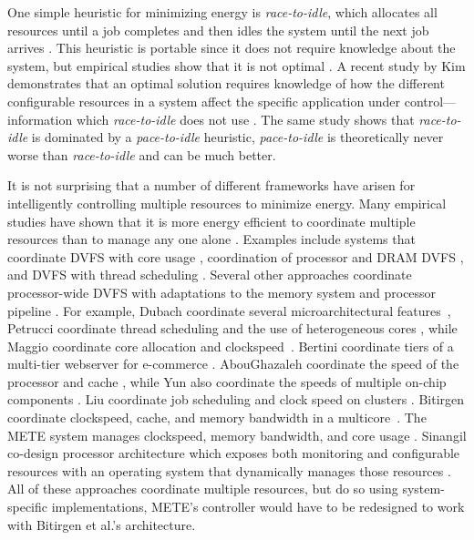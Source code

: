 One simple heuristic for minimizing energy is \emph{race-to-idle}, which allocates all resources until a job completes and then idles the system until the next job arrives \cite{google}.
This heuristic is portable since it does not require knowledge about the system, but empirical studies show that it is not optimal \cite{google,Cheng2009,Yun2010,Yang2007}.
A recent study by Kim \etal demonstrates that an optimal solution requires knowledge of how the different configurable resources in a system affect the specific application under control---information which \emph{race-to-idle} does not use \cite{kim-cpsna2015}.
The same study shows that \emph{race-to-idle} is dominated by a \emph{pace-to-idle} heuristic, \ie \emph{pace-to-idle} is theoretically never worse than \emph{race-to-idle} and can be much better.

It is not surprising that a number of different frameworks have arisen for intelligently controlling multiple resources to minimize energy.
Many empirical studies have shown that it is more energy efficient to coordinate multiple resources than to manage any one alone \cite{google,Cheng2009,Yun2010,Yang2007}.
Examples include systems that coordinate DVFS with core usage \cite{packandcap-old,packandcap-new,TCST}, coordination of processor and DRAM DVFS \cite{CoScale,Chen2011,Felter2005,Li2007}, and DVFS with thread scheduling \cite{Rangan2009,Winter2010}.
Several other approaches coordinate processor-wide DVFS with adaptations to the memory system and processor pipeline \cite{METE,Bitirgen2008,dubach2010}.
For example, Dubach \etal coordinate several microarchitectural features~\cite{dubach2010},
Petrucci \etal coordinate thread scheduling and the use of heterogeneous cores \cite{Petrucci2012}, while Maggio \etal coordinate core allocation and clockspeed~\cite{TCST}.
Bertini \etal coordinate tiers of a multi-tier webserver for e-commerce \cite{Bertini2007}.
AbouGhazaleh \etal coordinate the speed of the processor and cache \cite{AbouGhazaleh2007}, while Yun \etal also coordinate the speeds of multiple on-chip components \cite{Yun2010}.
Liu \etal coordinate job scheduling and clock speed on clusters \cite{Liu2008}.
Bitirgen \etal coordinate clockspeed, cache, and memory bandwidth in a multicore~\cite{Bitirgen2008}.
The METE system manages clockspeed, memory bandwidth, and core usage \cite{METE}.
Sinangil \etal co-design processor architecture which exposes both monitoring and configurable resources with an operating system that dynamically manages those resources \cite{sinangil2014self}.
All of these approaches coordinate multiple resources, but do so using system-specific implementations, \eg METE's controller would have to be redesigned to work with Bitirgen et al.'s architecture.


